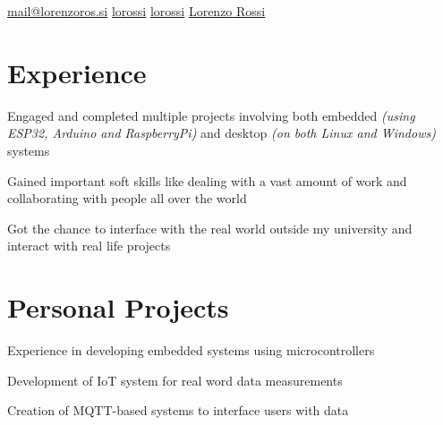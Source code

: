 \documentclass[]{plushcv}
\begin{document}
%
%

{
  {\href{mailto:mail@lorenzoros.si}{mail@lorenzoros.si}}
  {\href{https://www.github.com/lorossi}{lorossi}}
  {\href{https://www.instagram.com/lorossi/}{lorossi}}
  {\href{https://www.linkedin.com/in/lorenzo-rossi-897628212/}{Lorenzo Rossi}}
}

%
%

\begin{minipage}[t]{0.60\textwidth}


  \section{Experience}
  \vspace{\topsep} %
  \begin{tightemize}
    \sectionsep
    \item Engaged and completed multiple projects involving both embedded \textit{(using ESP32, Arduino and RaspberryPi)} and desktop \textit{(on both Linux and Windows)} systems
    \item Gained important soft skills like dealing with a vast amount of work and collaborating with people all over the world
    \item Got the chance to interface with the real world outside my university and interact with real life projects
  \end{tightemize}
  \sectionsep


  \section{Personal Projects}

  \begin{tightemize}
    \item Experience in developing embedded systems using microcontrollers
    \item Development of IoT system for real word data measurements
    \item Creation of MQTT-based systems to interface users with data
  \end{tightemize}
  \sectionsep


\end{minipage}
\end{document}

